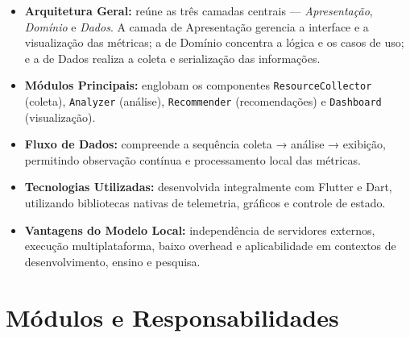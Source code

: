 \documentclass[12pt,a4paper,oneside]{abntex2}
\begin{document}
\begin{itemize}
  \item \textbf{Arquitetura Geral:} reúne as três camadas centrais — \textit{Apresentação}, \textit{Domínio} e \textit{Dados}. A camada de Apresentação gerencia a interface e a visualização das métricas; a de Domínio concentra a lógica e os casos de uso; e a de Dados realiza a coleta e serialização das informações.
  \item \textbf{Módulos Principais:} englobam os componentes \texttt{ResourceCollector} (coleta), \texttt{Analyzer} (análise), \texttt{Recommender} (recomendações) e \texttt{Dashboard} (visualização). 
  \item \textbf{Fluxo de Dados:} compreende a sequência coleta → análise → exibição, permitindo observação contínua e processamento local das métricas.
  \item \textbf{Tecnologias Utilizadas:} desenvolvida integralmente com Flutter e Dart, utilizando bibliotecas nativas de telemetria, gráficos e controle de estado.
  \item \textbf{Vantagens do Modelo Local:} independência de servidores externos, execução multiplataforma, baixo overhead e aplicabilidade em contextos de desenvolvimento, ensino e pesquisa.
\end{itemize}


\section{Módulos e Responsabilidades}
\end{document}
